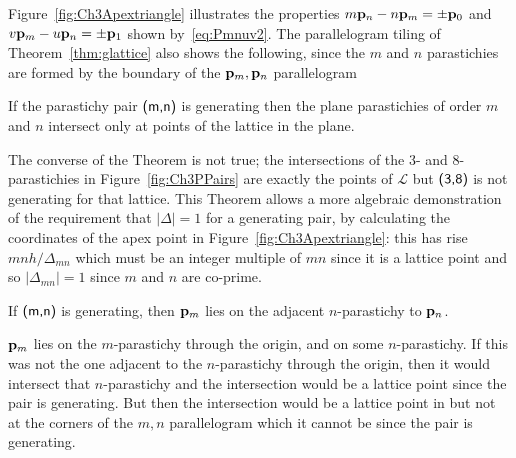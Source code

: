  Figure~\ref{fig:Ch3Apextriangle} illustrates the properties $m{\mathbf p}_{n}-n{\mathbf p}_{m}=\pm{\mathbf p}_{0}$ and $v{\mathbf p}_{m}-u{\mathbf p}_{n}=\pm{\mathbf p}_{1}$ shown by~\eqref{eq:Pmnuv2}.
%
%
%
The parallelogram tiling of Theorem~\ref{thm:glattice} also shows the following, since the $m$ and $n$ parastichies are formed by the boundary of the ${\mathbf p}_{m},{\mathbf p}_{n}$ parallelogram
\begin{theorem}
	\label{thm:planeintersect}
	If the parastichy pair $\textsf{(m,n)}$ is generating then the plane parastichies of order $m$ and $n$ intersect only at points of the lattice in the plane.
\end{theorem}
The converse of the Theorem is not true; the intersections of the 3- and 8-parastichies in  Figure~\ref{fig:Ch3PPairs} are exactly the points of $\mathcal{L}$ but $\textsf{(3,8)}$ is not generating for that lattice. 
This Theorem allows a more algebraic demonstration of the requirement that $|\Delta|=1$ for a generating pair,  by calculating the coordinates of the apex point in Figure~\ref{fig:Ch3Apextriangle}: this has rise $mnh/\Delta_{mn}$ which must be an integer multiple of $mn$ since it is a lattice point and so $|\Delta_{mn}|=1$ since $m$ and $n$ are co-prime.  

	
\begin{jExercise}
	If $\textsf{(m,n)}$ is generating, then ${\mathbf p}_{m}$ lies on the adjacent $n$-parastichy to ${\mathbf p}_{n}$. 
\end{jExercise}

\begin{jAnswer}
	${\mathbf p}_{m}$ lies on the $m$-parastichy through the origin, and on some $n$-parastichy. If this was not the one adjacent to the $n$-parastichy through the origin, then it would intersect that $n$-parastichy and the intersection would be a lattice point since the pair is generating. But then the intersection would be a lattice point in but not at the corners of the $m,n$ parallelogram which it cannot be since the pair is generating. 
\end{jAnswer}

